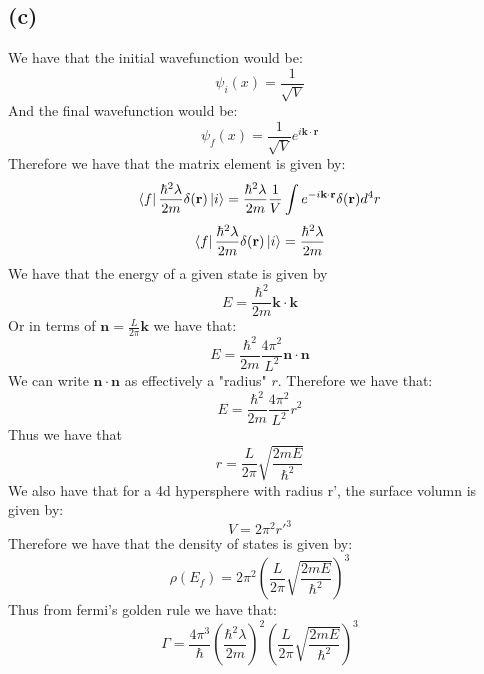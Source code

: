 \documentclass[11pt]{article}
\begin{document}
\subsection*{(c)}
We have that the initial wavefunction would be:
$$\psi_i(x) = \frac{1}{\sqrt{V}}$$
And the final wavefunction would be:
$$\psi_f(x) = \frac{1}{\sqrt{V}}e^{i\mathbf{k}\cdot\mathbf{r}}$$
Therefore we have that the matrix element is given by:
$$\bra{f}\frac{\hbar^2\lambda}{2m}\delta(\mathbf{r})\ket{i} = \frac{\hbar^2\lambda}{2m}\frac{1}{V}\int e^{-i\mathbf{k}\cdot\mathbf{r}}\delta(\mathbf{r})d^4r$$
$$\bra{f}\frac{\hbar^2\lambda}{2m}\delta(\mathbf{r})\ket{i} = \frac{\hbar^2\lambda}{2m}$$
We have that the energy of a given state is given by 
$$E = \frac{\hbar^2}{2m} \mathbf{k}\cdot \mathbf{k}$$
Or in terms of $\mathbf{n} = \frac{L}{2\pi} \mathbf{k}$ we have that:
$$E = \frac{\hbar^2}{2m} \frac{4\pi^2}{L^2} \mathbf{n}\cdot \mathbf{n}$$
We can write $\mathbf{n}\cdot \mathbf{n}$ as effectively a "radius" $r$. Therefore we have that:
$$E = \frac{\hbar^2}{2m} \frac{4\pi^2}{L^2} r^2$$
Thus we have that 
$$r = \frac{L}{2\pi}\sqrt{\frac{2mE}{\hbar^2}}$$
We also have that for a 4d hypersphere with radius r', the surface volumn is given by:
$$V = 2\pi^2r'^3$$
Therefore we have that the density of states is given by:
$$\rho(E_f) = 2\pi^2 \left(\frac{L}{2\pi}\sqrt{\frac{2mE}{\hbar^2}}\right)^3$$
Thus from fermi's golden rule we have that:
$$\Gamma = \frac{4\pi^3}{\hbar}\left(\frac{\hbar^2\lambda}{2m}\right)^2 \left(\frac{L}{2\pi}\sqrt{\frac{2mE}{\hbar^2}}\right)^3$$
\end{document}
